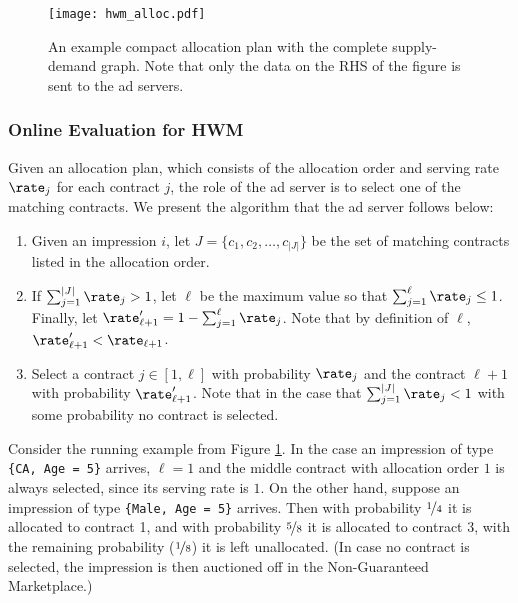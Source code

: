 \begin{figure}[t]
\centering
\texttt{[image: hwm\_alloc.pdf]}
\caption{An example compact allocation plan with the complete supply-demand graph. Note that only the data on the RHS of the figure is sent to the ad servers.}
\label{fig:plan}
\end{figure}

\subsubsection{Online Evaluation for HWM} \label{sec:online} Given an
allocation plan, which consists of the allocation order and serving
rate $\rate_j$ for each contract $j$, the role of the ad server is
to select one of the matching contracts. We present the algorithm
that the ad server follows below:
\begin{enumerate}\itemsep=0in
\item Given an impression $i$, let $J = \{c_1, c_2, \ldots, c_{|J|} \}$ be the set of matching contracts listed in the allocation order.
\item If $\sum_{j = 1}^{|J|} \rate_j > 1$, let $\ell$ be the maximum value so that $\sum_{j=1}^{\ell} \rate_{j} \leq 1$. Finally, let $\rate'_{\ell+1} = 1 - \sum_{j=1}^{\ell} \rate_j$. Note that by definition of $\ell$, $\rate'_{\ell+1} < \rate_{\ell + 1}$.
\item Select a contract $j \in [1, \ell]$ with probability $\rate_j$ and the contract $\ell+1$ with probability $\rate'_{\ell + 1}$. Note that in the case that $\sum_{j=1}^{|J|} \rate_j < 1$ with some probability no contract is selected.
\end{enumerate}

Consider the running example from Figure \ref{fig:plan}.
In the case an impression of type \texttt{\{CA, Age = 5\}} arrives, $\ell = 1$
and the middle contract with allocation order $1$ is always selected, since its serving rate is $1$.
On the other hand, suppose an impression of type \texttt{\{Male, Age = 5\}} arrives.  Then with probability $\nicefrac{1}{4}$ it is allocated to contract 1, and with probability $\nicefrac{5}{8}$ it is allocated to contract 3, with the remaining probability ($\nicefrac{1}{8}$) it is left unallocated.
(In case no contract is selected, the impression is then auctioned off in the Non-Guaranteed Marketplace.)

